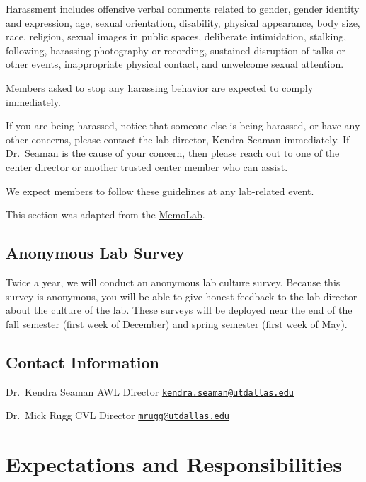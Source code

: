\documentclass[]{book}
\begin{document}
Harassment includes offensive verbal comments related to gender, gender identity and expression, age, sexual orientation, disability, physical appearance, body size, race, religion, sexual images in public spaces, deliberate intimidation, stalking, following, harassing photography or recording, sustained disruption of talks or other events, inappropriate physical contact, and unwelcome sexual attention.

Members asked to stop any harassing behavior are expected to comply immediately.

If you are being harassed, notice that someone else is being harassed, or have any other concerns, please contact the lab director, Kendra Seaman immediately. If Dr.~Seaman is the cause of your concern, then please reach out to one of the center director or another trusted center member who can assist.

We expect members to follow these guidelines at any lab-related event.

This section was adapted from the \href{https://github.com/memobc/memolab-manual\#code-of-conduct}{MemoLab}.

\hypertarget{anonymous-lab-survey}{%
\section{Anonymous Lab Survey}\label{anonymous-lab-survey}}

Twice a year, we will conduct an anonymous lab culture survey. Because this survey is anonymous, you will be able to give honest feedback to the lab director about the culture of the lab. These surveys will be deployed near the end of the fall semester (first week of December) and spring semester (first week of May).

\hypertarget{contact-information}{%
\section{Contact Information}\label{contact-information}}

Dr.~Kendra Seaman
AWL Director
\href{mailto:kendra.seaman@utdallas.edu}{\nolinkurl{kendra.seaman@utdallas.edu}}

Dr.~Mick Rugg
CVL Director
\href{mailto:mrugg@utdallas.edu}{\nolinkurl{mrugg@utdallas.edu}}

\hypertarget{expectations-and-responsibilities}{%
\chapter{Expectations and Responsibilities}\label{expectations-and-responsibilities}}
\end{document}
